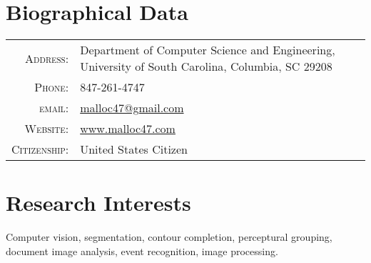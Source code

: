 \documentclass[a4paper,10pt]{article}
\begin{document}
\pagestyle{empty}


\par{\bigskip\par}

\section{Biographical Data}

\begin{tabular}{r p{3.5in}}
  \textsc{Address:}	& Department of Computer Science and Engineering, University of South Carolina, Columbia, SC 29208 \\
  \textsc{Phone:}     & 847-261-4747\\
  \textsc{email:}     & \href{mailto:malloc47@gmail.com}{malloc47@gmail.com} \\
  \textsc{Website:}	& \href{http://www.malloc47.com}{www.malloc47.com} \\
  \textsc{Citizenship:} & United States Citizen \\
\end{tabular}

\section{Research Interests}

Computer vision, segmentation, contour completion, perceptural grouping, document image analysis, event recognition, image processing.
\end{document}
